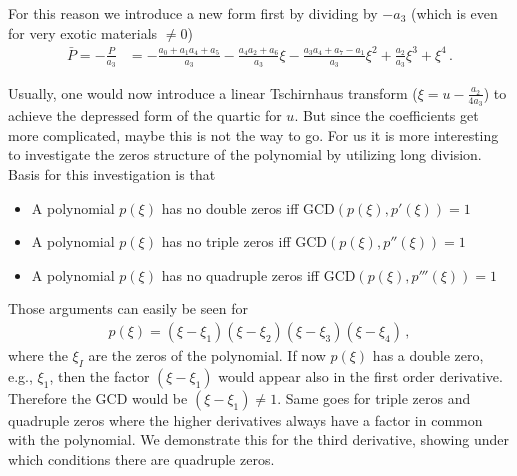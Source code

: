 \documentclass[a4paper,12pt]{article}
\begin{document}
For this reason we introduce a new form first by dividing by $-a_3$ (which is even for very exotic materials $\ne0$)
\begin{align}
 \bar{P} = -\frac{P}{a_3} &= -\frac{a_0 + a_1 a_4 + a_5}{a_3} - \frac{a_4 a_2 + a_6}{a_3} \xi - \frac{a_3 a_4 + a_7 - a_1}{a_3} \xi^2 + \frac{a_2}{a_3} \xi^3 + \xi^4\,.
\end{align}

Usually, one would now introduce a linear Tschirnhaus transform ($\xi = u - \tfrac{a_2}{4 a_3}$) to achieve the depressed form of the quartic for $u$. 
But since the coefficients get more complicated, maybe this is not the way to go. For us it is more interesting to investigate the zeros structure of 
the polynomial by utilizing long division. Basis for this investigation is that
\begin{itemize}
 \item A polynomial $p(\xi)$ has no double zeros iff $\text{GCD}(p(\xi), p'(\xi)) = 1$
 \item A polynomial $p(\xi)$ has no triple zeros iff $\text{GCD}(p(\xi), p''(\xi)) = 1$
 \item A polynomial $p(\xi)$ has no quadruple zeros iff $\text{GCD}(p(\xi), p'''(\xi)) = 1$
\end{itemize}
Those arguments can easily be seen for
\begin{align}
 p(\xi) = (\xi - \xi_1)(\xi - \xi_2)(\xi - \xi_3)(\xi - \xi_4)\,,
\end{align}
where the $\xi_I$ are the zeros of the polynomial. If now $p(\xi)$ has a double zero, e.g., $\xi_1$, then the factor $(\xi - \xi_1)$
would appear also in the first order derivative. Therefore the GCD would be $(\xi - \xi_1) \ne 1$. Same goes for triple zeros and
quadruple zeros where the higher derivatives always have a factor in common with the polynomial. We demonstrate this for the third
derivative, showing under which conditions there are quadruple zeros.
\end{document}
